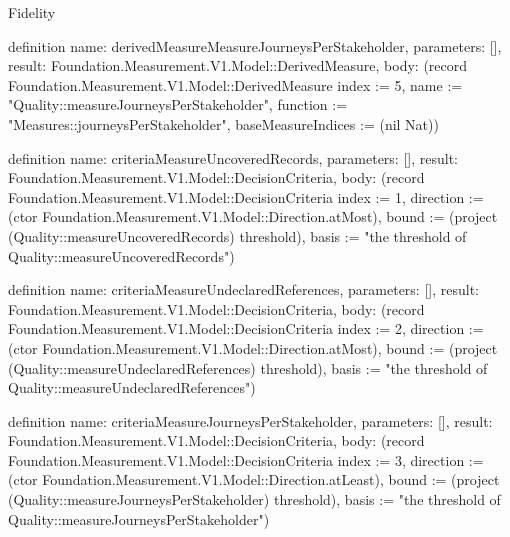 \begin{lexlean}{Fidelity}
\begin{semanticmodule}
definition{
  name: derivedMeasureMeasureJourneysPerStakeholder,
  parameters: [],
  result: Foundation.Measurement.V1.Model::DerivedMeasure,
  body: (record Foundation.Measurement.V1.Model::DerivedMeasure {index := 5, name := "Quality::measureJourneysPerStakeholder", function := "Measures::journeysPerStakeholder", baseMeasureIndices := (nil Nat)})
}

definition{
  name: criteriaMeasureUncoveredRecords,
  parameters: [],
  result: Foundation.Measurement.V1.Model::DecisionCriteria,
  body: (record Foundation.Measurement.V1.Model::DecisionCriteria {index := 1, direction := (ctor Foundation.Measurement.V1.Model::Direction.atMost), bound := (project (Quality::measureUncoveredRecords) threshold), basis := "the threshold of Quality::measureUncoveredRecords"})
}

definition{
  name: criteriaMeasureUndeclaredReferences,
  parameters: [],
  result: Foundation.Measurement.V1.Model::DecisionCriteria,
  body: (record Foundation.Measurement.V1.Model::DecisionCriteria {index := 2, direction := (ctor Foundation.Measurement.V1.Model::Direction.atMost), bound := (project (Quality::measureUndeclaredReferences) threshold), basis := "the threshold of Quality::measureUndeclaredReferences"})
}

definition{
  name: criteriaMeasureJourneysPerStakeholder,
  parameters: [],
  result: Foundation.Measurement.V1.Model::DecisionCriteria,
  body: (record Foundation.Measurement.V1.Model::DecisionCriteria {index := 3, direction := (ctor Foundation.Measurement.V1.Model::Direction.atLeast), bound := (project (Quality::measureJourneysPerStakeholder) threshold), basis := "the threshold of Quality::measureJourneysPerStakeholder"})
}


\end{semanticmodule}
\end{lexlean}

